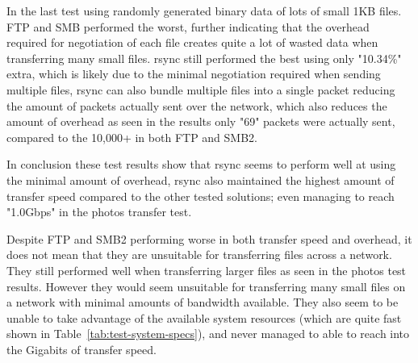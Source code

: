 In the last test using randomly generated binary data of lots of small 1KB files. FTP and SMB performed the worst, further indicating that the overhead required for negotiation of each file creates quite a lot of wasted data when transferring many small files. rsync still performed the best using only "10.34\%" extra, which is likely due to the minimal negotiation required when sending multiple files, rsync can also bundle multiple files into a single packet reducing the amount of packets actually sent over the network, which also reduces the amount of overhead as seen in the results only "69" packets were actually sent, compared to the 10,000+ in both FTP and SMB2.

In conclusion these test results show that rsync seems to perform well at using the minimal amount of overhead, rsync also maintained the highest amount of transfer speed compared to the other tested solutions; even managing to reach "1.0Gbps" in the photos transfer test.

Despite FTP and SMB2 performing worse in both transfer speed and overhead, it does not mean that they are unsuitable for transferring files across a network. They still performed well when transferring larger files as seen in the photos test results. However they would seem unsuitable for transferring many small files on a network with minimal amounts of bandwidth available. They also seem to be unable to take advantage of the available system resources (which are quite fast shown in Table~\ref{tab:test-system-specs}), and never managed to able to reach into the Gigabits of transfer speed.

